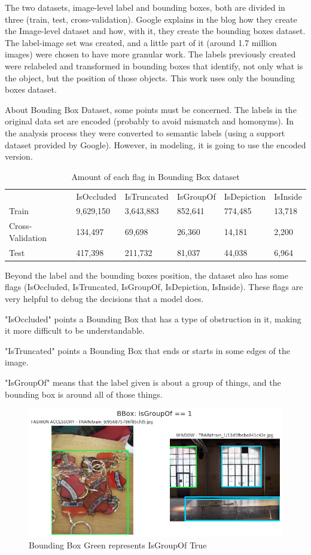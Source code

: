 \documentclass[11pt, a4paper, twocolumn]{article}
\begin{document}
The two datasets, image-level label and bounding boxes, both are divided in three (train, test, cross-validation). Google explains in the blog \cite{imgdataset} how they create the Image-level dataset and how, with it, they create the bounding boxes dataset. The label-image set was created, and a little part of it (around 1.7 million images) were chosen to have more granular work. The labels previously created were relabeled and transformed in bounding boxes that identify, not only what is the object, but the position of those objects. This work uses only the bounding boxes dataset.

About Bouding Box Dataset, some points must be concerned.
The labels in the original data set are encoded (probably to avoid mismatch and homonyms). In the analysis process they were converted to semantic labels (using a support dataset provided by Google). However, in modeling, it is going to use the encoded version. 

\begin{table}[ht]
	\footnotesize
	\centering
	\caption{ \footnotesize Amount of each flag in Bounding Box dataset }
	\label{table2}
	\begin{tabular}{llllll}
		& IsOccluded & IsTruncated & IsGroupOf & IsDepiction & IsInside \\
		\rowcolor[HTML]{EFEFEF} 
		Train            & 9,629,150  & 3,643,883   & 852,641   & 774,485     & 13,718   \\
		Cross-Validation & 134,497    & 69,698      & 26,360    & 14,181      & 2,200    \\
		\rowcolor[HTML]{EFEFEF} 
		Test             & 417,398    & 211,732     & 81,037    & 44,038      & 6,964   
	\end{tabular}
\end{table}

Beyond the label and the bounding boxes position, the dataset also has some flags (IsOccluded, IsTruncated, IsGroupOf, IsDepiction, IsInside). These flags are very helpful to debug the decisions that a model does.

"IsOccluded" points a Bounding Box that has a type of obstruction in it, making it more difficult to be understandable.

"IsTruncated" points a Bounding Box that ends or starts in some edges of the image.

"IsGroupOf" means that the label given is about a group of things, and the bounding box is around all of those things.

\begin{figure}[!ht]
	\centering
	\includegraphics[width=.5\textwidth]{isgroupof-true.png}
	\caption{\scriptsize Bounding Box Green represents IsGroupOf True }
\end{figure}
\end{document}
